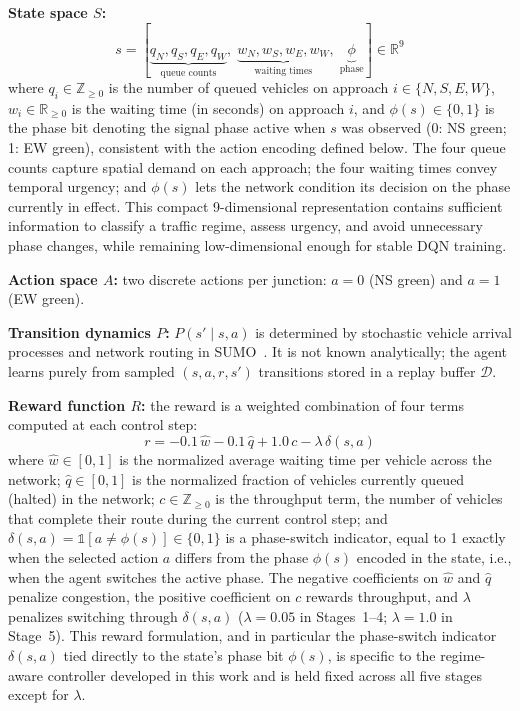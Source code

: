 \documentclass[lettersize,journal]{IEEEtran}
\begin{document}
\textbf{State space $S$:}
\[
s = [\underbrace{q_N, q_S, q_E, q_W}_{\text{queue counts}},\;
     \underbrace{w_N, w_S, w_E, w_W}_{\text{waiting times}},\;
     \underbrace{\phi}_{\text{phase}}] \in \mathbb{R}^9
\]
where $q_i\in\mathbb{Z}_{\geq0}$ is the number of queued vehicles on
approach $i\in\{N,S,E,W\}$, $w_i\in\mathbb{R}_{\geq0}$ is the waiting time
(in seconds) on approach $i$, and $\phi(s)\in\{0,1\}$ is the phase bit
denoting the signal phase active when $s$ was observed (0: NS green; 1: EW
green), consistent with the action encoding defined below. The four queue
counts capture spatial demand on each approach; the four waiting times
convey temporal urgency; and $\phi(s)$ lets the network condition its
decision on the phase currently in effect. This compact 9-dimensional
representation contains sufficient information to classify a traffic
regime, assess urgency, and avoid unnecessary phase changes, while
remaining low-dimensional enough for stable DQN training.

\textbf{Action space $A$:} two discrete actions per junction: $a=0$ (NS
green) and $a=1$ (EW green).

\textbf{Transition dynamics $P$:} $P(s'\mid s,a)$ is determined by
stochastic vehicle arrival processes and network routing in
SUMO~\cite{lopez2018microscopic,krajzewicz2012sumo}. It is not
known analytically; the agent learns purely from sampled $(s,a,r,s')$
transitions stored in a replay buffer $\mathcal{D}$.

\textbf{Reward function $R$:} the reward is a weighted combination of four
terms computed at each control step:
\begin{equation}
\label{eq:reward}
r = -0.1\,\hat{w} - 0.1\,\hat{q} + 1.0\,c - \lambda\,\delta(s,a)
\end{equation}
where $\hat{w}\in[0,1]$ is the normalized average waiting time per vehicle
across the network; $\hat{q}\in[0,1]$ is the normalized fraction of
vehicles currently queued (halted) in the network; $c\in\mathbb{Z}_{\geq0}$
is the throughput term, the number of vehicles that complete their route
during the current control step; and
$\delta(s,a) = \mathbb{1}[a\neq\phi(s)]\in\{0,1\}$ is a phase-switch
indicator, equal to 1 exactly when the selected action $a$ differs from the
phase $\phi(s)$ encoded in the state, i.e., when the agent switches the
active phase. The negative coefficients on $\hat{w}$ and $\hat{q}$ penalize
congestion, the positive coefficient on $c$ rewards throughput, and
$\lambda$ penalizes switching through $\delta(s,a)$ ($\lambda=0.05$ in
Stages~1--4; $\lambda=1.0$ in Stage~5). This reward formulation, and in
particular the phase-switch indicator $\delta(s,a)$ tied directly to the
state's phase bit $\phi(s)$, is specific to the regime-aware controller
developed in this work and is held fixed across all five stages except for
$\lambda$.
\end{document}
